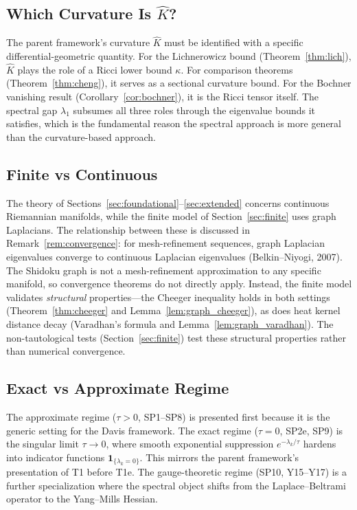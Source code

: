\documentclass[11pt]{article}
\theoremstyle{definition}
\theoremstyle{remark}
\begin{document}
\subsection{Which Curvature Is $\hat{K}$?}

The parent framework's curvature $\hat{K}$ must be identified with a specific differential-geometric quantity. For the Lichnerowicz bound (Theorem~\ref{thm:lich}), $\hat{K}$ plays the role of a Ricci lower bound $\kappa$. For comparison theorems (Theorem~\ref{thm:cheng}), it serves as a sectional curvature bound. For the Bochner vanishing result (Corollary~\ref{cor:bochner}), it is the Ricci tensor itself. The spectral gap $\lambda_1$ subsumes all three roles through the eigenvalue bounds it satisfies, which is the fundamental reason the spectral approach is more general than the curvature-based approach.

\subsection{Finite vs Continuous}

The theory of Sections~\ref{sec:foundational}--\ref{sec:extended} concerns continuous Riemannian manifolds, while the finite model of Section~\ref{sec:finite} uses graph Laplacians. The relationship between these is discussed in Remark~\ref{rem:convergence}: for mesh-refinement sequences, graph Laplacian eigenvalues converge to continuous Laplacian eigenvalues (Belkin--Niyogi, 2007). The Shidoku graph is not a mesh-refinement approximation to any specific manifold, so convergence theorems do not directly apply. Instead, the finite model validates \emph{structural} properties---the Cheeger inequality holds in both settings (Theorem~\ref{thm:cheeger} and Lemma~\ref{lem:graph_cheeger}), as does heat kernel distance decay (Varadhan's formula and Lemma~\ref{lem:graph_varadhan}). The non-tautological tests (Section~\ref{sec:finite}) test these structural properties rather than numerical convergence.

\subsection{Exact vs Approximate Regime}

The approximate regime ($\tau > 0$, SP1--SP8) is presented first because it is the generic setting for the Davis framework. The exact regime ($\tau = 0$, SP2e, SP9) is the singular limit $\tau \to 0$, where smooth exponential suppression $e^{-\lambda_k/\tau}$ hardens into indicator functions $\mathbf{1}_{\{\lambda_k = 0\}}$. This mirrors the parent framework's presentation of T1 before T1e. The gauge-theoretic regime (SP10, Y15--Y17) is a further specialization where the spectral object shifts from the Laplace--Beltrami operator to the Yang--Mills Hessian.
\end{document}

